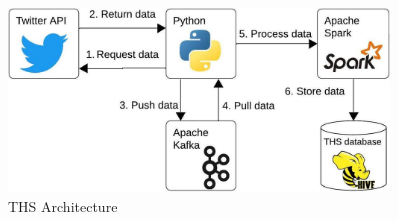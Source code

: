  
  \begin{figure}[!h]
    \centering
        \includegraphics[width=0.9\textwidth]{figures/ths_architecture.jpeg}
        \caption{THS Architecture}
        \label{ths_architecture}
\end{figure}




